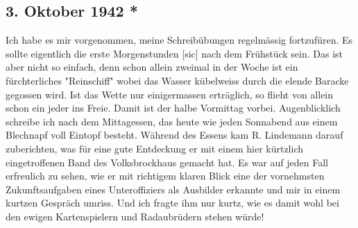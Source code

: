 \subsection{3. Oktober 1942 *}

Ich habe es mir vorgenommen, meine Schreib\"{u}bungen regelm\"{a}ssig fortzuf\"{u}ren.
Es sollte eigentlich die erste Morgenstunden{\color{red} [sic] } nach dem Fr\"{u}hst\"{u}ck sein.
Das ist aber nicht so einfach, denn schon allein zweimal in der Woche ist ein f\"{u}rchterliches "Reinschiff" wobei das Wasser k\"{u}belweiss durch die elende Baracke gegossen wird.
Ist das Wette nur einigermassen ertr\"{a}glich, so flieht von allein schon ein jeder ins Freie.
Damit ist der halbe Vormittag vorbei.
Augenblicklich schreibe ich nach dem Mittagessen, das heute wie jeden Sonnabend aus einem Blechnapf voll Eintopf besteht.
W\"{a}hrend des Essens kam R. Lindemann darauf zuberichten, was f\"{u}r eine gute Entdeckung er mit einem hier k\"{u}rtzlich eingetroffenen Band des Volksbrockhaus gemacht hat.
Es war auf jeden Fall erfreulich zu sehen, wie er mit richtigem klaren Blick eine der vornehmsten Zukunftsaufgaben eines Unteroffiziers als Ausbilder erkannte und mir in einem kurtzen Gespr\"{a}ch umriss.
Und ich fragte ihm nur kurtz, wie es damit wohl bei den ewigen Kartenspielern und Radaubr\"{u}dern stehen w\"{u}rde!

\clearpage
